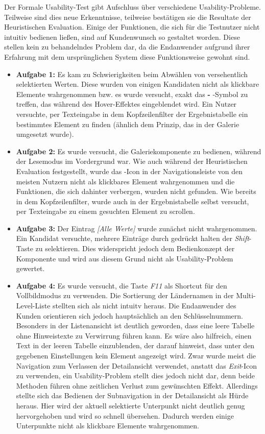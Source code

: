 Der Formale Usability-Test gibt Aufschluss über verschiedene Usability-Probleme. Teilweise sind dies neue Erkenntnisse, teilweise bestätigen sie die Resultate der Heuristischen Evaluation. Einige der Funktionen, die sich für die Testnutzer nicht intuitiv bedienen ließen, sind auf Kundenwunsch so gestaltet worden. Diese stellen kein zu behandelndes Problem dar, da die Endanwender aufgrund ihrer Erfahrung mit dem ursprünglichen System diese Funktionsweise gewohnt sind.\par
\begin{itemize}
\item \textbf{Aufgabe 1:} Es kam zu Schwierigkeiten beim Abwählen von versehentlich selektierten Werten. Diese wurden von einigen Kandidaten nicht als klickbare Elemente wahrgenommen bzw. es wurde versucht, exakt das \textbf{-} -Symbol zu treffen, das während des Hover-Effektes eingeblendet wird. Ein Nutzer versuchte, per Texteingabe in dem Kopfzeilenfilter der Ergebnistabelle ein bestimmtes Element zu finden (ähnlich dem Prinzip, das in der Galerie umgesetzt wurde).
\item \textbf{Aufgabe 2:} Es wurde versucht, die Galeriekomponente zu bedienen, während der Lesemodus im Vordergrund war. Wie auch während der Heuristischen Evaluation festgestellt, wurde das -Icon in der Navigationsleiste von den meisten Nutzern nicht als klickbares Element wahrgenommen und die Funktionen, die sich dahinter verbergen, wurden nicht gefunden. Wie bereits in dem Kopfzeilenfilter, wurde auch in der Ergebnistabelle selbst versucht, per Texteingabe zu einem gesuchten Element zu scrollen.
\item \textbf{Aufgabe 3:} Der Eintrag \textit{[Alle Werte]} wurde zunächst nicht wahrgenommen. Ein Kandidat versuchte, mehrere Einträge durch gedrückt halten der \textit{Shift}-Taste zu selektieren. Dies widerspricht jedoch dem Bedienkonzept der Komponente und wird aus diesem Grund nicht als Usability-Problem gewertet.
\item \textbf{Aufgabe 4:} Es wurde versucht, die Taste \textit{F11} als Shortcut für den Vollbildmodus zu verwenden. Die Sortierung der Ländernamen in der Multi-Level-Liste stellten sich als nicht intuitv heraus. Die Endanwender des Kunden orientieren sich jedoch hauptsächlich an den Schlüsselnummern. Besonders in der Listenansicht ist deutlich geworden, dass eine leere Tabelle ohne Hinweistexte zu Verwirrung führen kann. Es wäre also hilfreich, einen Text in der leeren Tabelle einzublenden, der darauf hinweist, dass unter den gegebenen Einstellungen kein Element angezeigt wird. Zwar wurde meist die Navigation zum Verlassen der Detailansicht verwendet, anstatt das \textit{Exit}-Icon zu verwenden, ein Usability-Problem stellt dies jedoch nicht dar, denn beide Methoden führen ohne zeitlichen Verlust zum gewünschten Effekt. Allerdings stellte sich das Bedienen der Subnavigation in der Detailansicht als Hürde heraus. Hier wird der aktuell selektierte Unterpunkt nicht deutlich genug hervorgehoben und wird so schnell übersehen. Dadurch werden einige Unterpunkte nicht als klickbare Elemente wahrgenommen.

\end{itemize}
